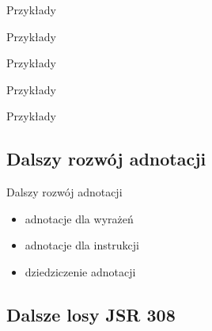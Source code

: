\documentclass{beamer}
\begin{document}
\begin{frame}{Przykłady}
  
  
\end{frame}

\begin{frame}{Przykłady}
  
  
\end{frame}

\begin{frame}{Przykłady}
  
  
\end{frame}

\begin{frame}{Przykłady}
  
\end{frame}

\begin{frame}{Przykłady}
  
  
\end{frame}

\subsection{Dalszy rozwój adnotacji}

\begin{frame}{Dalszy rozwój adnotacji}
  \begin{itemize}
  \item<1-> adnotacje dla wyrażeń
  \item<2-> adnotacje dla instrukcji
  \item<3-> dziedziczenie adnotacji
  \end{itemize}
\end{frame}

\subsection{Dalsze losy JSR 308}
\end{document}
